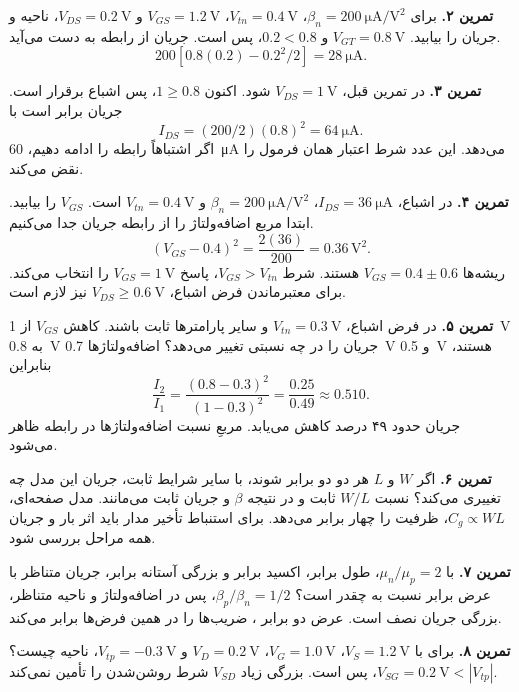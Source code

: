 \textbf{تمرین ۲.} برای \(\beta_n=\qty{200}{\micro\ampere\per\volt\squared}\)،
\(V_{tn}=\qty{0.4}{\volt}\)، \(V_{GS}=\qty{1.2}{\volt}\) و
\(V_{DS}=\qty{0.2}{\volt}\)، ناحیه و جریان را بیابید.
\(V_{GT}=\qty{0.8}{\volt}\) و \(0.2<0.8\)، پس  است.
جریان از رابطه  به دست می‌آید.
\[
 200[0.8(0.2)-0.2^2/2]=\qty{28}{\micro\ampere}.
\]

\textbf{تمرین ۳.} در تمرین قبل، \(V_{DS}=\qty{1}{\volt}\) شود.
اکنون \(1\ge0.8\)، پس اشباع برقرار است. جریان برابر است با
\[
 I_{DS}=(200/2)(0.8)^2=\qty{64}{\micro\ampere}.
\]
اگر اشتباهاً رابطه  را ادامه دهیم، \qty{60}{\micro\ampere} می‌دهد.
این عدد شرط اعتبار همان فرمول را نقض می‌کند.

\textbf{تمرین ۴.} در اشباع، \(I_{DS}=\qty{36}{\micro\ampere}\)،
\(\beta_n=\qty{200}{\micro\ampere\per\volt\squared}\) و
\(V_{tn}=\qty{0.4}{\volt}\) است. \(V_{GS}\) را بیابید.
ابتدا مربع اضافه‌ولتاژ را از رابطه جریان جدا می‌کنیم.
\[
 (V_{GS}-0.4)^2=\frac{2(36)}{200}=0.36\,\unit{\volt\squared}.
\]
ریشه‌ها \(V_{GS}=0.4\pm0.6\) هستند.
شرط \(V_{GS}>V_{tn}\)، پاسخ \(V_{GS}=\qty{1}{\volt}\) را انتخاب می‌کند.
برای معتبرماندن فرض اشباع، \(V_{DS}\ge\qty{0.6}{\volt}\) نیز لازم است.

\textbf{تمرین ۵.} در فرض اشباع، \(V_{tn}=\qty{0.3}{\volt}\) و سایر پارامترها
ثابت باشند. کاهش \(V_{GS}\) از \qty{1}{\volt} به \qty{0.8}{\volt}
جریان را در چه نسبتی تغییر می‌دهد؟
اضافه‌ولتاژها \qty{0.7}{\volt} و \qty{0.5}{\volt} هستند، بنابراین
\[
 \frac{I_2}{I_1}=\frac{(0.8-0.3)^2}{(1-0.3)^2}
 =\frac{0.25}{0.49}\approx0.510.
\]
جریان حدود ۴۹ درصد کاهش می‌یابد. مربعِ نسبت اضافه‌ولتاژها در رابطه ظاهر می‌شود.

\textbf{تمرین ۶.} اگر \(W\) و \(L\) هر دو دو برابر شوند، با سایر شرایط ثابت،
جریان این مدل چه تغییری می‌کند؟ نسبت \(W/L\) ثابت و در نتیجه \(\beta\)
و جریان ثابت می‌مانند. مدل صفحه‌ای، \(C_g\propto WL\)، ظرفیت را چهار برابر می‌دهد.
برای استنباط تأخیر مدار باید اثر بار و جریان همه مراحل بررسی شود.

\textbf{تمرین ۷.} با \(\mu_n/\mu_p=2\)، طول برابر، اکسید برابر و بزرگی آستانه
برابر، جریان متناظر  با عرض برابر نسبت به  چقدر است؟
\(\beta_p/\beta_n=1/2\)، پس در اضافه‌ولتاژ و ناحیه متناظر، بزرگی جریان نصف است.
عرض دو برابر ، ضریب‌ها را در همین فرض‌ها برابر می‌کند.

\textbf{تمرین ۸.} برای  با \(V_S=\qty{1.2}{\volt}\)،
\(V_G=\qty{1.0}{\volt}\)، \(V_D=\qty{0.2}{\volt}\) و
\(V_{tp}=-\qty{0.3}{\volt}\)، ناحیه چیست؟
\(V_{SG}=\qty{0.2}{\volt}<|V_{tp}|\)، پس  است.
بزرگی زیاد \(V_{SD}\) شرط روشن‌شدن را تأمین نمی‌کند.

